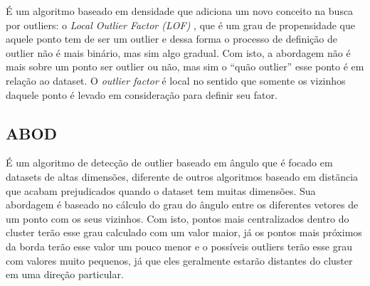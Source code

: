 
É um algoritmo baseado em densidade que adiciona um novo conceito na busca por outliers: o \textit{Local Outlier Factor (LOF)} \cite{Breunig:2000:LID:335191.335388}, que é um grau de propensidade que aquele ponto tem de ser um outlier e dessa forma o processo de definição de outlier não é mais binário, mas sim algo gradual. Com isto, a abordagem não é mais sobre um ponto ser outlier ou não, mas sim o ``quão outlier'' esse ponto é em relação ao dataset. O \textit{outlier factor} é local no sentido que somente os vizinhos daquele ponto é levado em consideração para definir seu fator.

\subsection{ABOD}


É um algoritmo de detecção de outlier baseado em ângulo \cite{Kriegel:2008:AOD:1401890.1401946} que é focado em datasets de altas dimensões, diferente de outros algoritmos baseado em distãncia que acabam prejudicados quando o dataset tem muitas dimensões. Sua abordagem é baseado no cálculo do grau do ângulo entre os diferentes vetores de um ponto com os seus vizinhos. Com isto, pontos mais centralizados dentro do cluster terão esse grau calculado com um valor maior, já os pontos mais próximos da borda terão esse valor um pouco menor e o possíveis outliers terão esse grau com valores muito pequenos, já que eles geralmente estarão distantes do cluster em uma direção particular. 

